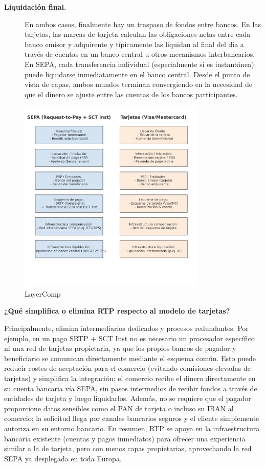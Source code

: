 \begin{description}
  \item[\textbf{Liquidación final.}]
    En ambos casos, finalmente hay un traspaso de fondos entre bancos. En las tarjetas, las marcas de tarjeta calculan las obligaciones netas entre cada banco emisor y adquirente y típicamente las liquidan al final del día a través de cuentas en un banco central u otros mecanismos interbancarios. En SEPA, cada transferencia individual (especialmente si es instantánea) puede liquidarse inmediatamente en el banco central. Desde el punto de vista de capas, ambos mundos terminan convergiendo en la necesidad de que el dinero se ajuste entre las cuentas de los bancos participantes.
\end{description}

\begin{figure}[H]
  \centering
  \includegraphics[width=0.8\textwidth]{Imagenes/LayerComp.png}
  \caption{LayerComp}
  \label{fig:Esquema por capas comparación}
\end{figure}

\bigskip

\noindent\textbf{¿Qué simplifica o elimina RTP respecto al modelo de tarjetas?}

Principalmente, elimina intermediarios dedicados y procesos redundantes. Por ejemplo, en un pago SRTP + SCT Inst no es necesario un procesador específico ni una red de tarjetas propietaria, ya que los propios bancos de pagador y beneficiario se comunican directamente mediante el esquema común. Esto puede reducir costes de aceptación para el comercio (evitando comisiones elevadas de tarjetas) y simplifica la integración: el comercio recibe el dinero directamente en su cuenta bancaria vía SEPA, sin pasos intermedios de recibir fondos a través de entidades de tarjeta y luego liquidarlos. Además, no se requiere que el pagador proporcione datos sensibles como el PAN de tarjeta o incluso su IBAN al comercio; la solicitud llega por canales bancarios seguros y el cliente simplemente autoriza en su entorno bancario. En resumen, RTP se apoya en la infraestructura bancaria existente (cuentas y pagos inmediatos) para ofrecer una experiencia similar a la de tarjeta, pero con menos capas propietarias, aprovechando la red SEPA ya desplegada en toda Europa.



